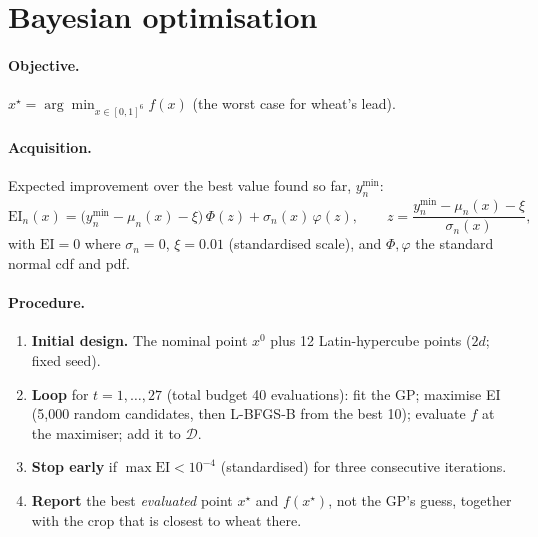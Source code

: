 \documentclass[11pt,a4paper]{article}
\numberwithin{equation}{section}
\begin{document}
\section{Bayesian optimisation}
\paragraph{Objective.} $x^\star=\arg\min_{x\in[0,1]^6} f(x)$ (the worst case for wheat's lead).

\paragraph{Acquisition.} Expected improvement over the best value found so far, $y^{\min}_n$:
\begin{equation}
\text{EI}_n(x)=\bigl(y^{\min}_n-\mu_n(x)-\xi\bigr)\,\Phi(z)+\sigma_n(x)\,\varphi(z),\qquad
z=\frac{y^{\min}_n-\mu_n(x)-\xi}{\sigma_n(x)},
\end{equation}
with $\text{EI}=0$ where $\sigma_n=0$, $\xi=0.01$ (standardised scale), and $\Phi,\varphi$ the standard normal cdf and
pdf.

\paragraph{Procedure.}
\begin{enumerate}[leftmargin=*]
\item \textbf{Initial design.} The nominal point $x^0$ plus 12 Latin-hypercube points ($2d$; fixed seed).
\item \textbf{Loop} for $t=1,\dots,27$ (total budget 40 evaluations):
fit the GP; maximise EI (5{,}000 random candidates, then L-BFGS-B from the best 10); evaluate $f$ at the maximiser;
add it to $\mathcal D$.
\item \textbf{Stop early} if $\max \text{EI}<10^{-4}$ (standardised) for three consecutive iterations.
\item \textbf{Report} the best \emph{evaluated} point $x^\star$ and $f(x^\star)$, not the GP's guess, together with
the crop that is closest to wheat there.
\end{enumerate}
\end{document}
